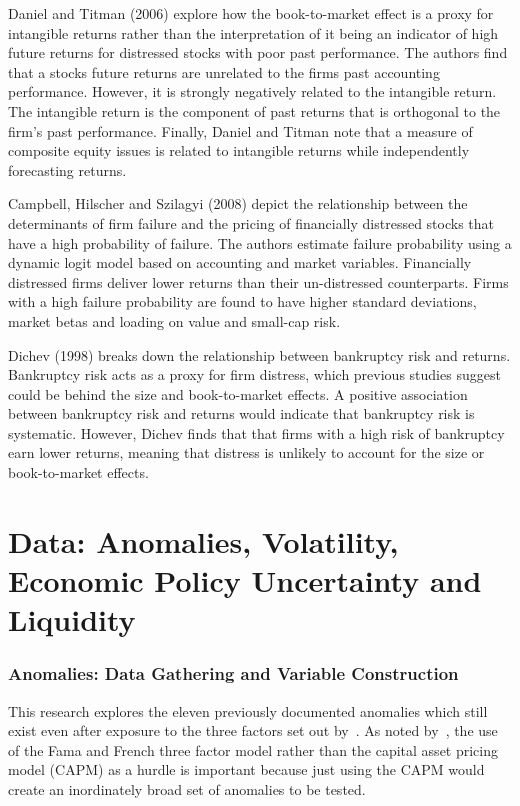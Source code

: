 \documentclass[a4paper]{article}                 %
\begin{document}
Daniel and Titman (2006) explore how the book-to-market effect is a proxy for intangible returns rather than the interpretation of it being an indicator of high future returns for distressed stocks with poor past performance. The authors find that a stocks future returns are unrelated to the firms past accounting performance. However, it is strongly negatively related to the intangible return. The intangible return is the component of past returns that is orthogonal to the firm’s past performance. Finally, Daniel and Titman note that a measure of composite equity issues is related to intangible returns while independently forecasting returns. 

Campbell, Hilscher and Szilagyi (2008) depict the relationship between the determinants of firm failure and the pricing of financially distressed stocks that have a high probability of failure. The authors estimate failure probability using a dynamic logit model based on accounting and market variables. Financially distressed firms deliver lower returns than their un-distressed counterparts. Firms with a high failure probability are found to have higher standard deviations, market betas and loading on value and small-cap risk. 

Dichev (1998) breaks down the relationship between bankruptcy risk and returns. Bankruptcy risk acts as a proxy for firm distress, which previous studies suggest could be behind the size and book-to-market effects. A positive association between bankruptcy risk and returns would indicate that bankruptcy risk is systematic. However, Dichev finds that that firms with a high risk of bankruptcy earn lower returns, meaning that distress is unlikely to account for the size or book-to-market effects. 

\section{Data: Anomalies, Volatility, Economic Policy Uncertainty and Liquidity}
\subsubsection{Anomalies: Data Gathering and Variable Construction}
This research explores the eleven previously documented anomalies which still exist even after exposure to the three factors set out by~\cite{fama1993common}. As noted by~\cite{stambaugh2012short}, the use of the Fama and French three factor model rather than the capital asset pricing model (CAPM) as a hurdle is important because just using the CAPM would create an inordinately broad set of anomalies to be tested. 
\end{document}

